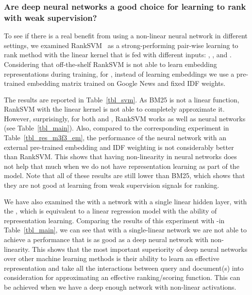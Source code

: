 
\subsubsection{Are deep neural networks a good choice for learning to rank with weak supervision?}
%
To see if there is a real benefit from using a non-linear neural network in different settings, we examined RankSVM~\citep{Joachims:2002} as a strong-performing pair-wise learning to rank method with the linear kernel that is fed with different inputs: \feedone, \feedtwo, and \feedthree. Considering that off-the-shelf RankSVM is not able to learn embedding representations during training, for \feedthree, instead of learning embeddings we use a pre-trained embedding matrix trained on Google News and fixed IDF weights. 

The results are reported in Table~\ref{tbl_svm}. As BM25 is not a linear function, RankSVM with the linear kernel is not able to completely approximate it. However, surprisingly, for both \feedone and \feedtwo, RankSVM works as well as neural networks (see Table~\ref{tbl_main}). 
%
Also, compared to the corresponding experiment in Table~\ref{tbl_res_m3f3_em}, the performance of the neural network with an external pre-trained embedding and IDF weighting is not considerably better than RankSVM. 
This shows that having non-linearity in neural networks does not help that much when we do not have representation learning as part of the model.
%
Note that all of these results are still lower than BM25, which shows that they are not good at learning from weak supervision signals for ranking. 
%

We have also examined the \modelone with a network with a single linear hidden layer, with the \feedthree, which is equivalent to a linear regression model with the ability of representation learning. 
Comparing the results of this experiment with \mone-\fthree in Table~\ref{tbl_main}, we can see that with a single-linear network we are not able to achieve a performance that is as good as a deep neural network with non-linearity.
%
This shows that the most important superiority of deep neural networks over other machine learning methods is their ability to learn an effective representation and take all the interactions between query and document(s) into consideration for approximating an effective ranking/scoring function. 
This can be achieved when we have a deep enough network with non-linear activations.

